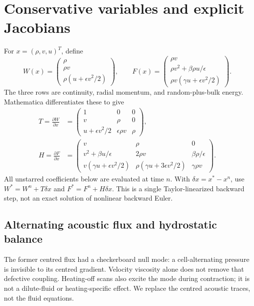 \documentclass[11pt]{article}
\begin{document}
\section{Conservative variables and explicit Jacobians}
For $x=(\rho,v,u)^T$, define
\begin{equation}
 W(x)=\begin{pmatrix}\rho\\\rho v\\\rho(u+\epsilon v^2/2)\end{pmatrix},\qquad
 F(x)=\begin{pmatrix}\rho v\\\rho v^2+\beta\rho u/\epsilon\\
 \rho v(\gamma u+\epsilon v^2/2)\end{pmatrix}.
\end{equation}
The three rows are continuity, radial momentum, and random-plus-bulk
energy. Mathematica differentiates these to give
\begin{align}
 T=\frac{\partial W}{\partial x}
 &=\begin{pmatrix}1&0&0\\v&\rho&0\\
 u+\epsilon v^2/2&\epsilon\rho v&\rho\end{pmatrix},
 \label{eq:timejac}\\
 H=\frac{\partial F}{\partial x}
 &=\begin{pmatrix}
 v&\rho&0\\
 v^2+\beta u/\epsilon&2\rho v&\beta\rho/\epsilon\\
 v(\gamma u+\epsilon v^2/2)&\rho(\gamma u+3\epsilon v^2/2)&\gamma\rho v
 \end{pmatrix}.
 \label{eq:fluxjac}
\end{align}
All unstarred coefficients below are evaluated at time $n$.
With $\delta x=x^*-x^n$, use
$W^*=W^n+T\delta x$ and $F^*=F^n+H\delta x$.
This is a single Taylor-linearized backward step, not an exact solution
of nonlinear backward Euler.

\subsection{Alternating acoustic flux and hydrostatic balance}
The former centred flux had a checkerboard null mode: a cell-alternating
pressure is invisible to its centred gradient. Velocity viscosity alone
does not remove that defective coupling. Heating-off scans also excite
the mode during contraction; it is not a dilute-fluid or heating-specific
effect. We replace the centred acoustic traces, not the fluid equations.
\end{document}
